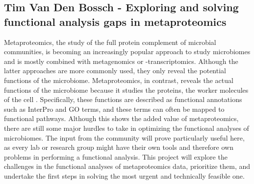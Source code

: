 \subsection{Tim Van Den Bossch - Exploring and solving functional analysis gaps in metaproteomics}

Metaproteomics, the study of the full protein complement of microbial communities, is becoming an increasingly popular approach to study microbiomes and is mostly combined with metagenomics or -transcriptomics. Although the latter approaches are more commonly used, they only reveal the potential functions of the microbiome. Metaproteomics, in contrast, reveals the actual functions of the microbiome because it studies the proteins, the worker molecules of the cell \citep{pmid32174200}. Specifically, these functions are described as functional annotations such as InterPro and GO terms, and these terms can often be mapped to functional pathways. Although this shows the added value of metaproteomics, there are still some major hurdles to take in optimizing the functional analyses of microbiomes. The input from the community will prove particularly useful here, as every lab or research group might have their own tools and therefore own problems in performing a functional analysis. This project will explore the challenges in the functional analyses of metaproteomics data, prioritize them, and undertake the first steps in solving the most urgent and technically feasible one.\\

